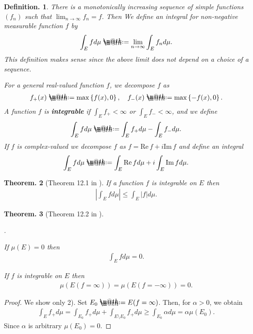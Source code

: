 \documentclass[openany, a4paper, oneside]{jsbook}
\makeatletter
\newcounter{enum2}
\renewenvironment{enumerate}{%
\begin{list}%
{%
\arabic{enum2}.\ \,%
}%
{%
\usecounter{enum2}
\setlength{\itemindent}{0pt}%
\setlength{\leftmargin}{15pt}%
\setlength{\rightmargin}{0pt}%
\setlength{\labelsep}{0pt}%
\setlength{\labelwidth}{6pt}%
\setlength{\itemsep}{0pt}%
\setlength{\parsep}{0pt}%
\setlength{\listparindent}{0pt}%
}
}{%
\end{list}%
}
\newcommand*{\defeq}{\mathrel{\rlap{%
\raisebox{0.3ex}{$\m@th\cdot$}}%
\raisebox{-0.3ex}{$\m@th\cdot$}}%
=}
\theoremstyle{break}
\newtheorem{thm}{Theorem.}[section]
\theoremstyle{breakdefn}
\newtheorem{defn}[thm]{Definition.}
\renewcommand{\Im}{\mathrm{Im} \,}
\renewcommand{\Re}{\mathrm{Re} \,}
\newcommand{\abs}[1]{\left|#1\right|}
\newcommand{\cbk}[1]{\left\{#1\right\}}
\newcommand{\upbf}[1]{\textup{\textbf{#1}}}
\makeatother
\begin{document}
\begin{defn}
 There is a monotonically increasing sequence of simple functions $(f_n)$ such that $\lim_{n \to \infty} f_n = f$.
 Then  We define an integral for non-negative measurable function $f$ by
 \begin{align}
  \int_E f d \mu
  \defeq
  \lim_{n \to \infty} \int_E f_n d \mu.
 \end{align}
 This definition makes sense since the above limit does not depend on a choice of a sequence.

 For a general real-valued function $f$, we decompose $f$ as
 \begin{align}
  f_+ (x)
  \defeq
  \max \cbk{f (x), 0}, \quad
  f_- (x)
  \defeq
  \max \cbk{- f (x), 0}.
 \end{align}
 A function $f$ is \upbf{integrable} if $\int_E f_+ < \infty$ or $\int_E f_- < \infty$, and we define
 \begin{align}
  \int_E f d \mu
  \defeq
  \int_E f_+ d \mu - \int_E f_- d \mu.
 \end{align}
 If $f$ is complex-valued we decompose $f$ as $f = \Re f + i \Im f$ and define an integral
 \begin{align}
  \int_E f d\mu
  \defeq
  \int_E \Re f d \mu + i \int_E \Im f d \mu.
 \end{align}
\end{defn}
\begin{thm}[Theorem 12.1 in \cite{SeizoIto1}]
 If a function $f$ is integrable on $E$ then
 \begin{align}
  \abs{\int_E f d\mu}
  \leq
  \int_E \abs{f} d\mu.
 \end{align}
\end{thm}
\begin{thm}[Theorem 12.2 in \cite{SeizoIto1}]
\begin{enumerate}
\item If $\mu (E) = 0$ then
    \begin{align}
     \int_E f d \mu = 0.
    \end{align}
\item If $f$ is integrable on $E$ then
    \begin{align}
     \mu (E (f = \infty)) = \mu (E (f = - \infty)) = 0.
    \end{align}
\end{enumerate}
\end{thm}
\begin{proof}
We show only 2).
Set $E_0 \defeq E (f = \infty)$.
Then, for $\alpha > 0$, we obtain
\begin{align}
 \int_E f_+ d \mu
 =
 \int_{E_0} f_+ d \mu + \int_{E \setminus E_0} f_+ d \mu
 \geq
 \int_{E_0} \alpha d \mu
 =
 \alpha \mu (E_0).
\end{align}
Since $\alpha$ is arbitrary $\mu (E_0) = 0$.
\end{proof}
\end{document}
